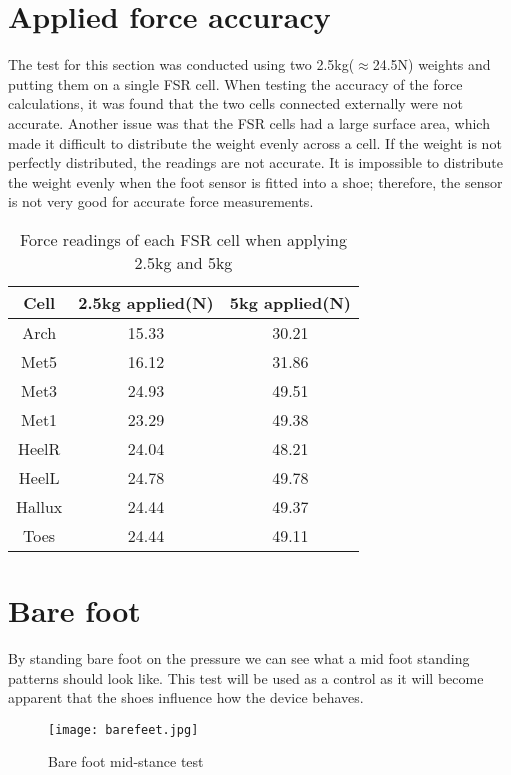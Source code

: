 \section{Applied force accuracy}
The test for this section was conducted using two 2.5kg($\approx$24.5N) weights and putting them on a single FSR cell. When testing the accuracy of the force calculations, it was found that the two cells connected externally were not accurate. Another issue was that the FSR cells had a large surface area, which made it difficult to distribute the weight evenly across a cell. If the weight is not perfectly distributed, the readings are not accurate. It is impossible to distribute the weight evenly when the foot sensor is fitted into a shoe; therefore, the sensor is not very good for accurate force measurements.

\begin{table}[!h]
    \centering
    \caption{Force readings of each FSR cell when applying 2.5kg and 5kg}
    \begin{tabular}{||c c c||} 
     \hline
     Cell & 2.5kg applied(N) & 5kg applied(N) \\ [0.5ex] 
     \hline\hline
     Arch &15.33 & 30.21 \\ 
     \hline
     Met5 &16.12 & 31.86 \\
     \hline
     Met3 &24.93& 49.51\\
     \hline
     Met1 &23.29 & 49.38 \\
     \hline
     HeelR &24.04& 48.21\\
     \hline
     HeelL &24.78& 49.78\\ 
     \hline
     Hallux &24.44& 49.37\\ 
     \hline
     Toes &24.44& 49.11\\
     \hline
    \end{tabular}
    \end{table}
\section{Bare foot}

By standing bare foot on the pressure we can see what a mid foot standing patterns should look like. This test will be used as a control as it will become apparent that the shoes influence how the device behaves.
\begin{figure}[!htb]
    \centering
    \texttt{[image: barefeet.jpg]}
    \caption{Bare foot mid-stance test}
    \label{fig:calibration}
\end{figure}
\clearpage
